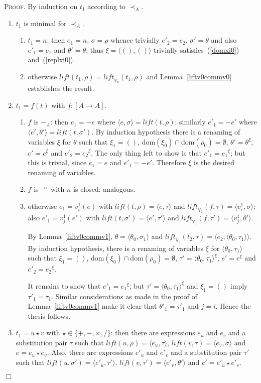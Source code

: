 \documentclass{article}
\newenvironment{proof}{\smallskip\textsc{Proof.}}{\hspace*{\fill}$\Box$}
\newcommand{\V}{{\mathbb V}}
\newcommand{\less}{\mathrel{\prec_A}}
\newcommand{\liftv}[1]{\ensuremath{\mathit{lift}_{\V_{#1}}}}
\newcommand{\lift}{\ensuremath{\mathit{lift}}}
\newcommand{\dom}{\ensuremath{\mathrm{dom}}}
\newcommand{\renamevar}[2]{\ensuremath{{#1}^{#2}}}
\newcommand{\isrenamevar}[3]{\ensuremath{{#1}=\renamevar{#2}{#3}}}
\newcommand{\idn}{()}
\begin{document}
\begin{proof}
By induction on $t_1$ according to $\less$.
\begin{enumerate}
\item $t_1$ is minimal for $\less$.
\begin{enumerate}
\item $t_1=\underline n$: then $e_1=n$, $\sigma=\rho$ whence trivially
$e'_2=e_2$, $\sigma'=\theta$ and also $e'_1=e_1$ and $\theta'=\theta$;
thus $\xi=\langle\idn,\idn\rangle$ trivially
satisfies~(\ref{domxi0}) and~(\ref{replxi0}).
\item otherwise $\lift(t_1,\rho)=\liftv0(t_1,\rho)$ and
Lemma~\ref{liftv0commv0} establishes the result.
\end{enumerate}
\item $t_1=f(t)$ with $f:[A\to A]$.
\begin{enumerate}
\item $f$ is $-_A$: then $e_1=-e$ where
$\langle e,\sigma\rangle=\lift(t,\rho)$; similarly $e'_1=-e'$ where
$\langle e',\theta'\rangle=\lift(t,\sigma')$.
By induction hypothesis there is a renaming of variables $\xi$ for
$\theta$ such that $\xi_1=\idn$,
$\dom(\xi_0)\cap\dom(\rho_0)=\emptyset$,
{\isrenamevar{\theta'}\theta\xi}, {\isrenamevar{e'}e\xi} and
{\isrenamevar{e'_2}{e_2}\xi}.
The only thing left to show is that {\isrenamevar{e'_1}{e_1}\xi}; but
this is trivial, since $e_1=e$ and $e'_1=-e'$.  Therefore $\xi$ is the
desired renaming of variables.
\item $f$ is $\cdot^n$ with $n$ is closed: analogous.
\item otherwise $e_1=v^1_i(e)$ with $\lift(t,\rho)=\langle e,\tau\rangle$
and $\liftv1(f,\tau)=\langle v^1_i,\sigma\rangle$;
also $e'_1=v^1_j(e')$ with $\lift(t,\sigma')=\langle
e',\tau'\rangle$ and $\liftv1(f,\tau')=\langle v^1_j,\theta'\rangle$.

By Lemma~\ref{liftv0commv1}, $\theta=\langle\theta_0,\sigma_1\rangle$
and $\liftv0(t_2,\tau)=\langle e_2,\langle\theta_0,\tau_1\rangle\rangle$.
By induction hypothesis, there is a renaming of variables $\xi$ for
$\langle\theta_0,\tau_1\rangle$ such that $\xi_1=\idn$,
$\dom(\xi_0)\cap\dom(\rho_0)=\emptyset$,
{\isrenamevar{\tau'}{\langle\theta_0,\tau_1\rangle}\xi},
{\isrenamevar{e'}e\xi} and {\isrenamevar{e'_2}{e_2}\xi}.

It remains to show that {\isrenamevar{e'_1}{e_1}\xi}; but
{\isrenamevar{\tau'}{\langle\theta_0,\tau_1\rangle}\xi}
and $\xi_1=\idn$ imply $\tau'_1=\tau_1$.
Similar considerations as made in the proof of Lemma~\ref{liftv0commv1}
make it clear that $\theta'_1=\tau'_1$ and $j=i$.  Hence the thesis follows.
\end{enumerate}
\item $t_1=u\star v$ with $\star\in\{+,-,\times,/\}$: then there are
expressions $e_u$ and $e_v$ and a substitution pair $\tau$ such that
$\lift(u,\rho)=\langle e_u,\tau\rangle$, $\lift(v,\tau)=\langle
e_v,\sigma\rangle$ and $e=e_u\star e_v$.  Also, there are expressions
$e'_u$ and $e'_v$ and a substitution pair $\tau'$ such that
$\lift(u,\sigma')=\langle e'_u,\tau'\rangle$, $\lift(v,\tau')=\langle
e'_v,\theta'\rangle$ and $e'=e'_u\star e'_v$.


\end{enumerate}
\end{proof}
\end{document}
